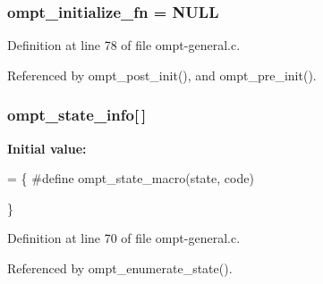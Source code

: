 \hypertarget{ompt-general_8c_abffbd160d0e3b772a9252976be687844}{
\subsubsection[{ompt\-\_\-initialize\-\_\-fn}]{ ompt\-\_\-initialize\-\_\-fn = N\-U\-L\-L\hspace{0.3cm}{\ttfamily [static]}}}\label{ompt-general_8c_abffbd160d0e3b772a9252976be687844}


Definition at line 78 of file ompt-\/general.\-c.



Referenced by ompt\-\_\-post\-\_\-init(), and ompt\-\_\-pre\-\_\-init().

\hypertarget{ompt-general_8c_a65d0012802b770afefce726b4c18307d}{
\subsubsection[{ompt\-\_\-state\-\_\-info}]{ ompt\-\_\-state\-\_\-info\mbox{[}$\,$\mbox{]}}}\label{ompt-general_8c_a65d0012802b770afefce726b4c18307d}
{\bfseries Initial value\-:}
\begin{DoxyCode}
= \{
\textcolor{preprocessor}{#define ompt\_state\_macro(state, code) }
\textcolor{preprocessor}{}

\}
\end{DoxyCode}


Definition at line 70 of file ompt-\/general.\-c.



Referenced by ompt\-\_\-enumerate\-\_\-state().

